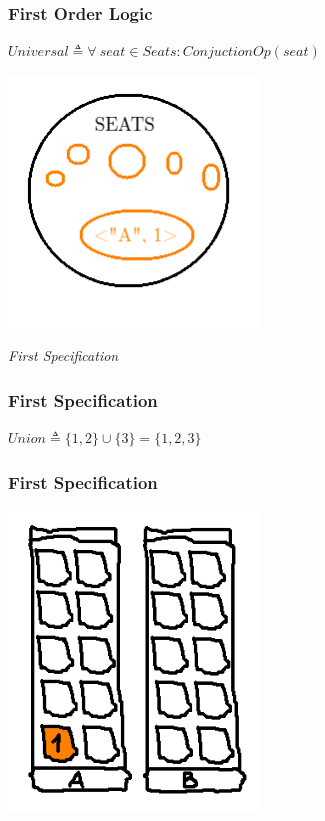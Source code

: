 \documentclass{beamer}
\begin{document}
\begin{frame}
  \frametitle{First Order Logic}

  $Universal \triangleq \forall\ seat \in Seats : ConjuctionOp(seat)$
  
  \begin{center}
    \includegraphics[width=0.5\textwidth]{tla-introduction/universal}
  \end{center}
\end{frame}

\begin{frame}
  \centering \Huge \emph{First Specification}
\end{frame}

\begin{frame}
  \frametitle{First Specification}
  
  $Union \triangleq \{1, 2\} \cup \{3\} = \{1, 2, 3\}$
\end{frame}

\begin{frame}
  \frametitle{First Specification}
  
  \begin{center}
    \includegraphics[width=0.5\textwidth]{tla-introduction/single-seat}
  \end{center}
\end{frame}
\end{document}
